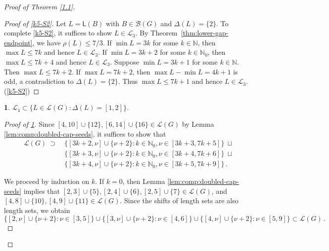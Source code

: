 \documentclass[a4paper, 10pt]{amsart}
\theoremstyle{plain}
\theoremstyle{definition}
\theoremstyle{definition}
\newtheorem{claim}{}[theorem]
\newcommand{\N}{\mathbb N}
\numberwithin{equation}{section}
\begin{document}
\begin{proof}[Proof of Theorem \ref{1.1}]
\begin{proof}[Proof of \ref{k5-S2}]
	Let $L = \mathsf L (B)$ with $B \in \mathcal B(G)$ and $\Delta(L)=\{2\}$. To complete \ref{k5-S2}, it suffices to show $L\in \mathcal L_3$.
	By Theorem~\ref{thm:lower-gap-endpoint}, we have
	$\rho(L)\le 7/3$. If $\min L=3k$ for some $k\in \N$, then $\max L\le 7k$ and hence $L\in \mathcal L_3$. If $\min L=3k+2$ for some $k\in \N_0$, then $\max L\le 7k+4$ and hence $L\in \mathcal L_3$. Suppose $\min L=3k+1$ for some $k\in \N$. Then $\max L\le 7k+2$. If $\max L=7k+2$, then $\max L-\min L=4k+1$ is odd, a contradiction to $\Delta(L)=\{2\}$. Thus $\max L\le 7k+1$ and hence $L\in \mathcal L_3$.\qedhere (\ref{k5-S2})
\end{proof}


\begin{claim}\label{k5-A3}
$\mathcal L_4\subset\big\{ L\in \mathcal L(G)\colon \Delta (L)=[1,2] \big\}$.
\end{claim}

\begin{proof}[Proof of \ref{k5-A3}]
Since $[4,10]\cup\{12\}, [6, 14]\cup\{16\}\in \mathcal L(G)$ by Lemma \ref{lem:comp:doubled-cap-seeds}, 	
it suffices to show that
\begin{align*}
	\mathcal L(G)\ \supset \
	&\big\{[3k+2, \nu]\cup\{\nu+2\} \colon k \in \N_0, \nu\in [3k+3, 7k+5] \big\} \ \sqcup \\
	\quad\quad  &\big\{[3k+3, \nu]\cup\{\nu+2\} \colon k \in \N_0, \nu\in [3k+4, 7k+6] \big\} \ \sqcup\\
	\quad\quad &\big\{[3k+4, \nu]\cup\{\nu+2\} \colon k \in \N_0, \nu\in [3k+5, 7k+9] \big\}\,.
\end{align*}	

We proceed by induction on $k$. 
If $k=0$, then Lemma
\ref{lem:comp:doubled-cap-seeds} implies that
$[2,3]\cup \{5\}, [2,4]\cup \{6\}, [2,5]\cup \{7\}\in \mathcal L(G)$,  and $[4,8]\cup \{10\}, [4,9]\cup \{11\}\in \mathcal L(G)$. Since the shifts of length sets are  also length sets, we obtain  
\[
\big\{[2, \nu]\cup\{\nu+2\} \colon \nu\in [3, 5] \big\} \cup \big\{[3, \nu]\cup\{\nu+2\} \colon \nu\in [4, 6] \big\} \cup\big\{[4, \nu]\cup\{\nu+2\} \colon \nu\in [5, 9] \big\}\subset \mathcal L(G)\,.
\]


\end{proof}
\end{proof}
\end{document}
